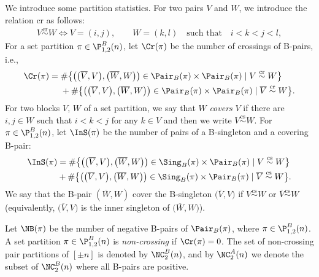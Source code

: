 We introduce some partition statistics.
For two pairs $V$ and $ W$, we introduce the relation $\text{cr}$ as follows:
\begin{gather*}
V\stackrel{\text{cr}}{\sim}W \iff
V=(i,j),\qquad W=(k,l)\quad \text{such that}\quad i<k<j<l,
\end{gather*}
For a set partition $\pi\in \P_{1,2}^{B}(n)$, let $\Cr(\pi)$ be the number of crossings of B-pairs, i.e.,
\begin{align*}
\Cr(\pi)={}&\#\big\{\big(\big(\overline{V}, V \big),\big(\overline{ W}, W\big)\big)\in \Pair_B(\pi)\times \Pair_B(\pi) \mid \text{$V\stackrel{\text{cr}}{\sim}W $}\big\}
\\
&+\#\big\{\big(\big(\overline{V}, V\big),\big(\overline{ W}, W\big)\big)\in \Pair_B(\pi)\times \Pair_B(\pi) \mid \text{$\overline{V}\stackrel{\text{cr}}{\sim}W $}\big\}.
\end{align*}
For two blocks $V$, $W$ of a set partition, we say that $W$ \emph{covers} $V$ if there are $i,j \in W$ such that $i <k <j$ for any $k\in V$ and then we write $V\stackrel{\text{cs}}{\sim}W $. For $\pi\in\P_{1,2}^{B}(n)$, let $\InS(\pi)$
be the number of pairs of a B-singleton and a covering B-pair:
\begin{align*}
\begin{split}
\InS(\pi)&=\#\big\{\big(\big(\overline{ V}, V \big),\big(\overline{ W}, W\big)
\big) \in \Sing_B(\pi) \times \Pair_B(\pi) \mid V\stackrel{\text{cs}}{\sim}W
\big\}
\\
 & +\#\big\{\big(\big(\overline{V}, V \big),\big(\overline{W}, W\big)\big) \in \Sing_B(\pi) \times \Pair_B(\pi) \mid \overline{V}\stackrel{\text{cs}}{\sim}W\big\}.
 \end{split}
\end{align*}
We say that the B-pair $(\overline{ W} , W)$ cover the B-singleton $\big(\overline{V}, V\big)$ if $V\stackrel{\text{cs}}{\sim}{W} $ or $\overline{V}\stackrel{\text{cs}}{\sim}{ W} $ (equivalently, $\big(\overline{V}, V\big)$ is the inner singleton of $\big(\overline{W} , W\big)$).

Let $\NB(\pi)$ be the number of negative B-pairs of $\Pair_B(\pi)$, where $\pi \in \P_{1,2}^{B}(n)$.
A set partition $\pi \in \P_{1,2}^{B}(n)$ is \emph{non-crossing} if $\Cr(\pi)=0$. The set of non-crossing pair partitions of $[\pm n]$ is denoted by $\NC^B_2(n)$, and by $\NC^A_2(n)$ we denote the subset of $\NC^B_2(n)$ where all B-pairs are positive.

